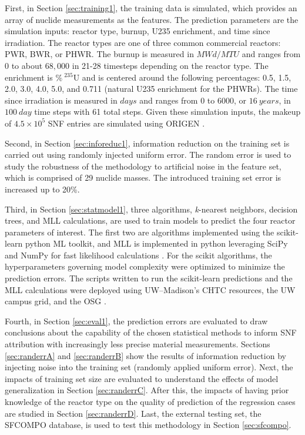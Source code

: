 First, in Section \ref{sec:training1}, the training data is simulated, which
provides an array of nuclide measurements as the features. The prediction
parameters are the simulation inputs: reactor type, burnup, \gls{U235}
enrichment, and time since irradiation.  The reactor types are one of three
common commercial reactors: \gls{PWR}, \gls{BWR}, or \gls{PHWR}.  The burnup is
measured in $MWd/MTU$ and ranges from 0 to about $68,000$ in 21-28 timesteps
depending on the reactor type.  The enrichment is $\%\:{}^{235}\text{U}$ and is
centered around the following percentages: 0.5, 1.5, 2.0, 3.0, 4.0, 5.0, and
0.711 (natural \gls{U235} enrichment for the \gls{PHWR}s).  The time since
irradiation is measured in $days$ and ranges from 0 to 6000, or $16\:years$, in
$100\:day$ time steps with 61 total steps. Given these simulation inputs, the
makeup of $4.5 \times 10^5$ \gls{SNF} entries are simulated using \gls{ORIGEN}
\cite{scale, origen, origenarp}.

Second, in Section \ref{sec:inforeduc1}, information reduction on the training
set is carried out using randomly injected uniform error. The random error is
used to study the robustness of the methodology to artificial noise in the
feature set, which is comprised of 29 nuclide masses.  The introduced training
set error is increased up to 20\%.

Third, in Section \ref{sec:statmodel1}, three algorithms, \textit{k}-nearest
neighbors, decision trees, and \gls{MLL} calculations, are used to train models
to predict the four reactor parameters of interest.  The first two are
algorithms implemented using the scikit-learn python \gls{ML} toolkit, and
\gls{MLL} is implemented in python leveraging SciPy and NumPy for fast
likelihood calculations \cite{scikit, scipy, numpy}.  For the scikit
algorithms, the hyperparameters governing model complexity were optimized to
minimize the prediction errors.  The scripts written to run the scikit-learn
predictions and the \gls{MLL} calculations were deployed using
\gls{UW}--Madison's \gls{CHTC} resources, the \gls{UW} campus grid, and the
\gls{OSG} \cite{osg07, osg09}.  

Fourth, in Section \ref{sec:eval1}, the prediction errors are evaluated to draw
conclusions about the capability of the chosen statistical methods to inform
\gls{SNF} attribution with increasingly less precise material measurements.
Sections \ref{sec:randerrA} and \ref{sec:randerrB} show the results of
information reduction by injecting noise into the training set (randomly
applied uniform error).  Next, the impacts of training set size are evaluated
to understand the effects of model generalization in Section
\ref{sec:randerrC}. After this, the impacts of having prior knowledge of the
reactor type on the quality of prediction of the regression cases are studied
in Section \ref{sec:randerrD}. Last, the external testing set, the
\gls{SFCOMPO} database, is used to test this methodology in Section
\ref{sec:sfcompo}. 

